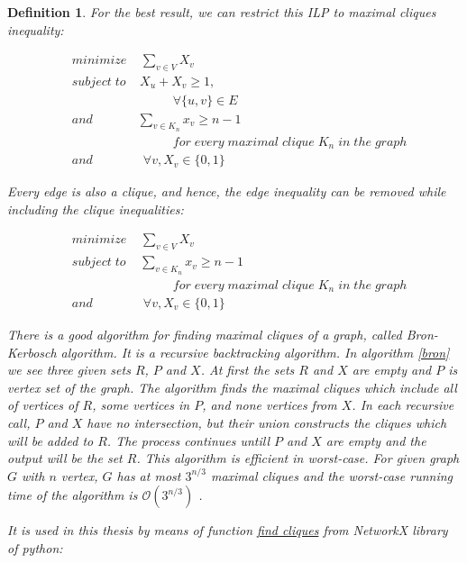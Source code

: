 \documentclass[12pt]{article}
\theoremstyle{slplain}
\newtheorem{defi}{Definition}
\begin{document}
\begin{defi}
For the best result, we can restrict this ILP to maximal cliques inequality:


\begin{align*}
&minimize \; \;\; \; \sum_{v\in V}X_v\\
&subject\; to \;\;\; \; X_u + X_v  \geq 1 ,\\
&\qquad 	\qquad\qquad\qquad	 \forall \{u,v\} \in E\\
&and	\qquad\quad\;\; \sum_{v\in K_n}x_v \geq n - 1\\
& \qquad\qquad \qquad\qquad for\; every\; maximal\; clique\; K_n\; in\; the\; graph\\
&and	\qquad\qquad	 \forall v, X_v\in \{0,1\}
\end{align*}

Every edge is also a clique, and hence, the edge inequality can be removed
while including the clique inequalities:


\begin{align*}
&minimize \; \;\; \; \sum_{v\in V}X_v\\
&subject\; to \;\;\; \; \sum_{v\in K_n}x_v \geq n - 1\\
& \qquad\qquad \qquad\qquad for\; every\; maximal\; clique\; K_n\; in\; the\; graph\\
&and	\qquad\qquad	 \forall v, X_v\in \{0,1\}
\end{align*}

There is a good algorithm for finding maximal cliques of a graph, called Bron-Kerbosch\cite{bron} algorithm. It is a recursive  backtracking algorithm. In algorithm \ref{bron} we see three given sets $R$, $P$ and $X$. At first the sets $R$ and $X$ are empty and $P$ is vertex set of the graph. The algorithm finds the maximal cliques which include all of vertices of $R$, some vertices in $P$, and none vertices from $X$. In each recursive call, $P$ and $X$ have no intersection, but their union constructs the cliques which will be added to $R$. The process continues untill $P$ and $X$ are empty and the output will be the set $R$. This algorithm is efficient in worst-case. For given graph $G$ with $n$ vertex, $G$ has at most $3^{n/3}$ maximal cliques and the worst-case running time of the algorithm is $\mathcal{O}(3^{n/3})$ \cite{moon}. 


It is used in this thesis by means of function \href{https://networkx.github.io/documentation/networkx-1.10/reference/generated/networkx.algorithms.clique.find_cliques.html}{find cliques} from NetworkX library of python:

\vspace{1cm}


\end{defi}
\end{document}
